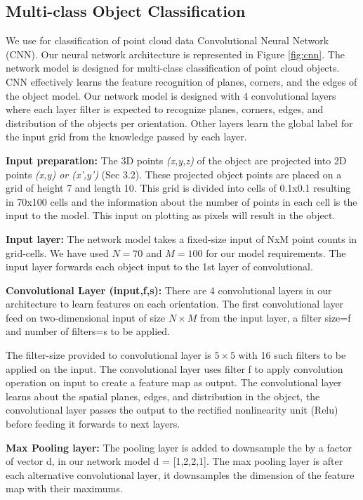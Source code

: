 \subsection{Multi-class Object Classification}
We use for classification of point cloud data Convolutional Neural Network (CNN).
Our neural network architecture is represented in Figure \ref{fig:cnn}.
The network model is designed for multi-class classification of 
point cloud objects.
CNN effectively learns the feature recognition of planes, corners, and the edges of the object model.
Our network model is designed with 4 convolutional layers where each layer filter is expected to
recognize planes, corners, edges, and distribution of the objects per orientation.
Other layers learn the global label for the input grid from the knowledge passed by each layer.

\textbf{Input preparation:}
The 3D points \textit{(x,y,z)} of the object are projected into 2D points \textit{(x,y) or (x',y')} (Sec 3.2).
These projected object points are placed on a grid of height 7 and length 10.
This grid is divided into cells of 0.1x0.1 resulting in 70x100 cells and the information about the number of points in each cell is the input to the model.
This input on plotting as pixels will result in the object.

\textbf{Input layer:}
The network model takes a fixed-size input of NxM point counts in grid-cells. We have
used $N=70$ and $M=100$ for our model requirements. The input layer forwards each object input to the 1st layer
of convolutional.


\textbf{Convolutional Layer (input,f,s):}
There are 4 convolutional layers in our architecture to learn features on each orientation.
The first convolutional layer feed on two-dimensional input of size $N \times  M$ from
the input layer, a filter size=f and number of filters=s to be applied.

The filter-size provided to convolutional layer is $5 \times 5$ with 16 such filters to be applied on the input.
The convolutional layer uses filter f to apply convolution operation on input to create a feature map as output.
The convolutional layer learns about the spatial planes, edges, and distribution in the object,
the convolutional layer passes the output to the rectified nonlinearity unit (Relu) before feeding
it forwards to next layers.

\textbf{Max Pooling layer:}
The pooling layer is added to downsample the by a factor of vector d, in
our network model d = [1,2,2,1]. The max pooling layer is after each alternative convolutional
layer, it downsamples the dimension of the feature map with their maximums.


